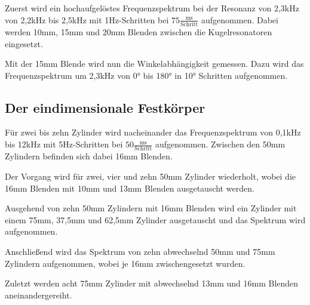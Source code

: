 \noindent
Zuerst wird ein hochaufgelöstes Frequenzspektrum bei der Resonanz von 2,3kHz von 2,2kHz bis 2,5kHz mit 1Hz-Schritten bei $75\frac{\text{ms}}{\text{Schritt}}$ aufgenommen.
Dabei werden 10mm, 15mm und 20mm Blenden zwischen die Kugelresonatoren eingesetzt.

\noindent
Mit der 15mm Blende wird nun die Winkelabhängigkeit gemessen.
Dazu wird das Frequenzspektrum um 2,3kHz von 0° bis 180° in 10° Schritten aufgenommen.

\subsection{Der eindimensionale Festkörper}
\label{fkp}

\noindent
Für zwei bis zehn Zylinder wird nacheinander das Frequenzspektrum von 0,1kHz bis 12kHz mit 5Hz-Schritten bei $50\frac{\text{ms}}{\text{Schritt}}$ aufgenommen.
Zwischen den 50mm Zylindern befinden sich dabei 16mm Blenden.

\noindent
Der Vorgang wird für zwei, vier und zehn 50mm Zylinder wiederholt, wobei die 16mm Blenden mit 10mm und 13mm Blenden ausgetauscht werden.

\noindent
Ausgehend von zehn 50mm Zylindern mit 16mm Blenden wird ein Zylinder mit einem 75mm, 37,5mm und 62,5mm Zylinder ausgetauscht und das Spektrum wird aufgenommen.

\noindent
Anschließend wird das Spektrum von zehn abwechselnd 50mm und 75mm Zylindern aufgenommen, wobei je 16mm zwischengesetzt wurden.

\noindent
Zuletzt werden acht 75mm Zylinder mit abwechselnd 13mm und 16mm Blenden aneinandergereiht.



